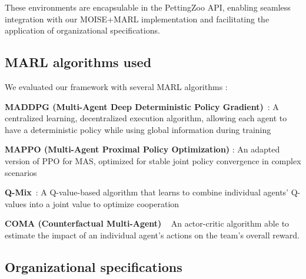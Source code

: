 \documentclass[sigconf]{aamas}
\begin{document}
These environments are encapsulable in the PettingZoo API, enabling seamless integration with our MOISE+MARL implementation and facilitating the application of organizational specifications.

\subsection{MARL algorithms used}

We evaluated our framework with several MARL algorithms :
%
\begin{enumerate*}[label={\roman*) },itemjoin={; \quad}]

    \item \textbf{MADDPG (Multi-Agent Deep Deterministic Policy Gradient)}~\cite{lowe2017multi}: A centralized learning, decentralized execution algorithm, allowing each agent to have a deterministic policy while using global information during training
    
    \item \textbf{MAPPO (Multi-Agent Proximal Policy Optimization)} \cite{yu2021mappo}: An adapted version of PPO for MAS, optimized for stable joint policy convergence in complex scenarios
    
    \item \textbf{Q-Mix}~\cite{rashid2018qmix}: A Q-value-based algorithm that learns to combine individual agents' Q-values into a joint value to optimize cooperation
    
    \item \textbf{COMA (Counterfactual Multi-Agent) }~\cite{foerster2018counterfactual} An actor-critic algorithm able to estimate the impact of an individual agent's actions on the team's overall reward.
\end{enumerate*}

\subsection{Organizational specifications}
\end{document}
